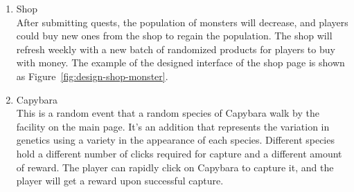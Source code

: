 \documentclass[12pt,oneside,openright,a4paper]{cpe-english-project}
\begin{document}
\begin{itemize}
\begin{itemize}
\begin{enumerate}
		\item Shop \\
		After submitting quests, the population of monsters will decrease, and players could buy new ones from the shop to regain the population. The shop will refresh weekly with a new batch of randomized products for players to buy with money. The example of the designed interface of the shop page is shown as Figure~\ref{fig:design-shop-monster}. \\
		\begin{minipage}[c]{\textwidth}\centering
		\label{fig:design-shop-monster}
		\end{minipage}

		\item Capybara \\
		This is a random event that a random species of Capybara walk by the facility on the main page. It's an addition that represents the variation in genetics using a variety in the appearance of each species. Different species hold a different number of clicks required for capture and a different amount of reward. The player can rapidly click on Capybara to capture it, and the player will get a reward upon successful capture.
		

\end{enumerate}
\end{itemize}
\end{itemize}
\end{document}
